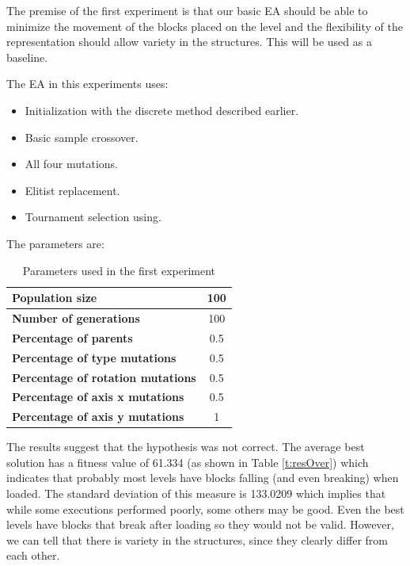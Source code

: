 \documentclass[runningheads,a4paper]{llncs}
\newcommand{\myfloatalign}{\centering} %
\begin{document}
The premise of the first experiment is that our basic EA should be able to 
minimize the movement of the blocks placed on the level and the flexibility of 
the representation should allow variety in the structures. This will
be used as a baseline.

The EA in this experiments uses:
\begin{itemize}
	\item  Initialization with the discrete method described earlier.
	\item  Basic sample crossover.
	\item  All four mutations.
	\item  Elitist replacement.
	\item  Tournament selection using.
\end{itemize}

The parameters are: %

\begin{table}[H]
	\myfloatalign
	\begin{tabular}{lc}
		\hline
		\textbf{Population size} & 100 \\ \hline
		\textbf{Number of generations} & 100 \\  \hline
		\textbf{Percentage of parents} &  0.5 \\  \hline
		\textbf{Percentage of type mutations} & 0.5 \\  \hline
		\textbf{Percentage of rotation mutations} & 0.5 \\  \hline
		\textbf{Percentage of axis x mutations}  & 0.5 \\  \hline
		\textbf{Percentage of axis y mutations}  & 1 \\  \hline
	\end{tabular}
	\caption{Parameters used in the first experiment} 
	\label{t:base}
\end{table}

The results suggest that the hypothesis was not correct. The average best 
solution has a fitness value of 61.334 (as shown in Table \ref{t:resOver}) 
which indicates that probably most levels have blocks falling (and even 
breaking) when loaded. The standard deviation of this measure is 133.0209 which 
implies that while some executions performed poorly, some others may be good. 
Even the best levels have blocks that break after loading so they would not be 
valid. However, we can tell that there is variety in the structures, since they 
clearly differ from each other. 
\end{document}
